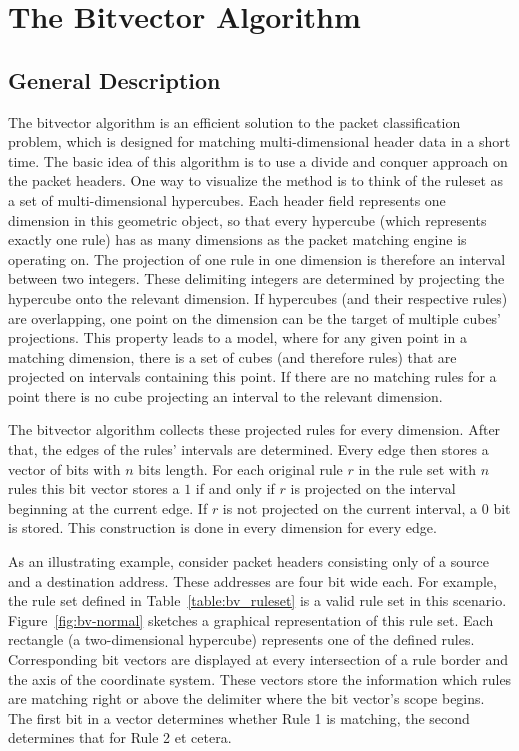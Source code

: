 \documentclass[a4paper,
		12pt,
		parskip=full,
		titlepage
		]{scrartcl}
\begin{document}
\section{The Bitvector Algorithm}
\subsection{General Description}
\label{sec:bv-general}
The bitvector algorithm \cite{bv} is an efficient solution to the packet 
classification problem, which is designed for matching multi-dimensional header data in a short time.
The basic idea of this algorithm is to use a divide and conquer approach on the packet headers.
One way to visualize the method is to think of the ruleset as a set of multi-dimensional hypercubes.
Each header field represents one dimension in this geometric object, so 
that every hypercube (which represents exactly one rule) has as many dimensions as the packet matching engine is operating on.
The projection of one rule in one dimension is therefore an interval between two integers.
These delimiting integers are determined by projecting the hypercube onto the relevant dimension.
If hypercubes (and their respective rules) are overlapping, one point on the dimension can be the target of multiple cubes' projections. 
This property leads to a model, where for any given point in a matching 
dimension, there is a set of cubes (and therefore rules) that are projected on intervals containing this point.
If there are no matching rules for a point there is no cube projecting an interval to the relevant dimension.

The bitvector algorithm collects these projected rules for every dimension.
After that, the edges of the rules' intervals are determined.%
Every edge then stores a vector of bits with $n$ bits length.
For each original rule $r$ in the rule set with $n$ rules this bit vector 
stores a $1$ if and only if $r$ is projected on the interval beginning at the current edge.
If $r$ is not projected on the current interval, a $0$ bit is stored.
This construction is done in every dimension for every edge.

As an illustrating example, consider packet headers consisting only of a source and a destination address.
These addresses are four bit wide each.
For example, the rule set defined in Table~\ref{table:bv_ruleset} is a valid rule set in this scenario.
Figure~\ref{fig:bv-normal} sketches a graphical representation of this rule set.
Each rectangle (a two-dimensional hypercube) represents one of the defined rules.
Corresponding bit vectors are displayed at every intersection of a rule border and the axis of the coordinate system.
These vectors store the information which rules are matching right or above the delimiter where the bit vector's scope begins.
The first bit in a vector determines whether Rule 1 is matching, the second determines that for Rule 2 et cetera.
\end{document}
